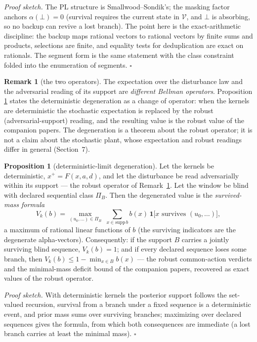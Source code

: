 \documentclass[10pt,twocolumn]{article}
\theoremstyle{definition}
\newtheorem{proposition}{Proposition}
\newtheorem{remark}{Remark}
\begin{document}
\emph{Proof sketch.} The PL structure is Smallwood--Sondik's; the masking
factor anchors \(\alpha(\bot) = 0\) (survival requires the current state
in \(\mathcal{V}\), and \(\bot\) is absorbing, so no backup can revive a
lost branch). The point here is the exact-arithmetic discipline: the
backup maps rational vectors to rational vectors by finite sums and
products, selections are finite, and equality tests for deduplication are
exact on rationals. The segment form is the same statement with the
class constraint folded into the enumeration of segments.
\hfill\(\square\)

\begin{remark}[the two operators]\label{rem:operators}
The expectation over the disturbance law and the adversarial reading of
its support are \emph{different Bellman operators}. Proposition
\ref{prop:degen} states the deterministic degeneration as a change of
operator: when the kernels are deterministic the stochastic expectation
is replaced by the robust (adversarial-support) reading, and the
resulting value is the robust value of the companion papers. The
degeneration is a theorem about the robust operator; it is not a claim
about the stochastic plant, whose expectation and robust readings differ
in general (Section~7).
\end{remark}

\begin{proposition}[deterministic-limit degeneration]\label{prop:degen}
Let the kernels be deterministic, \(x^{+} = F(x, a, d)\), and let the
disturbance be read adversarially within its support — the robust operator
of Remark~\ref{rem:operators}. Let the window be blind with declared
sequential class \(\Pi_{B}\). Then the degenerated value is the
\emph{survived-mass formula}
\[
V_{k}(b) = \max_{(u_{0},\dots) \in \Pi_{B}}\;
\sum_{x \in \mathrm{supp}\, b} b(x)\,
\mathbf{1}\bigl[ x \text{ survives } (u_{0}, \dots) \bigr],
\]
a maximum of rational linear functions of \(b\) (the surviving indicators
are the degenerate alpha-vectors). Consequently: if the support \(B\)
carries a jointly surviving blind sequence, \(V_{k}(b) = 1\); and if every
declared sequence loses some branch, then \(V_{k}(b) \le 1 - \min_{x \in
B} b(x)\) --- the robust common-action verdicts and the minimal-mass
deficit bound of the companion papers, recovered as exact values of the
robust operator.
\end{proposition}

\emph{Proof sketch.} With deterministic kernels the posterior support
follows the set-valued recursion, survival from a branch under a fixed
sequence is a deterministic event, and prior mass sums over surviving
branches; maximizing over declared sequences gives the formula, from
which both consequences are immediate (a lost branch carries at least the
minimal mass). \hfill\(\square\)
\end{document}
